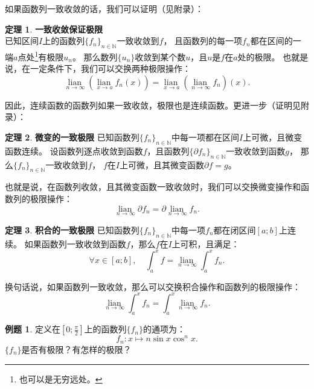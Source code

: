 \documentclass[12pt,UTF8]{ctexbook}
\newcommand{\lian}[1]{
    \underset{#1}{\operatorname{lian}\,}
}
\theoremstyle{definition}
\newtheorem{tm}{定理}[section]
\newtheorem{et}{例题}[section]
\theoremstyle{plain}
\begin{document}
如果函数列一致收敛的话，我们可以证明（见附录）：
\begin{tm}\textbf{一致收敛保证极限}\\
    已知区间$I$上的函数列$\{f_n\}_{n\in\mathbb{N}}$一致收敛到$f$，
    且函数列的每一项$f_n$都在区间的一端$a$点处\footnote{也可以是无穷远处。}有极限$u_n$。
    那么数列$\{u_n\}$收敛到某个数$u$，且$u$是$f$在$a$处的极限。
    也就是说，在一定条件下，我们可以交换两种极限操作：
    $$ \lian{n\to \infty} \left( \lian{x\to a} f_n(x) \right) = \lian{x\to a} \left(\lian{n\to \infty} f_n \right) (x). $$
\end{tm}

因此，连续函数的函数列如果一致收敛，极限也是连续函数。更进一步（证明见附录）：

\begin{tm}{\textbf{微变的一致极限}}
    已知函数列$\{f_n\}_{n\in\mathbb{N}}$中每一项都在区间$I$上可微，且微变函数连续。
    设函数列逐点收敛到函数$f$，且函数列$\{\partial f_n\}_{n\in\mathbb{N}}$一致收敛到函数$g$，
    那么$\{f_n\}_{n\in\mathbb{N}}$一致收敛到$f$，
    $f$在$I$上可微，且其微变函数$\partial f = g$。
\end{tm}

也就是说，在函数列收敛，且其微变函数一致收敛时，我们可以交换微变操作和函数列的极限操作：
$$ \lian{n\to \infty} \partial f_n = \partial \lian{n\to \infty} f_n. $$

\begin{tm}{\textbf{积合的一致极限}}
    已知函数列$\{f_n\}_{n\in\mathbb{N}}$中每一项$f_n$都在闭区间$[a;b]$上连续。
    如果函数列一致收敛到函数$f$，那么$f$在$I$上可积，且满足：
    $$ \forall x \in [a; b],\quad \int_{a}^x f = \lian{n\to \infty} \int_{a}^x f_n. $$
\end{tm}

换句话说，如果函数列一致收敛，那么可以交换积合操作和函数列的极限操作：
$$ \lian{n\to \infty} \int_{a}^x f_n = \int_{a}^x \lian{n\to \infty} f_n. $$

\begin{et}
    定义在$\left[0;\frac{\pi}{2}\right]$上的函数列$\{f_n\}$的通项为：
    $$ f_n: x\mapsto n\sin{x}\cos^n{x}. $$
    $\{f_n\}$是否有极限？有怎样的极限？
\end{et}
\end{document}
